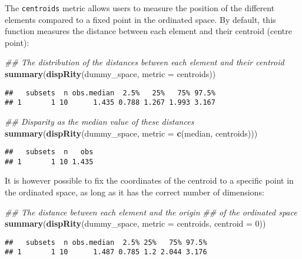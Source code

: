 \documentclass[
]{book}
\newenvironment{Shaded}{\begin{snugshade}}{\end{snugshade}}
\newcommand{\CommentTok}[1]{\textcolor[rgb]{0.56,0.35,0.01}{\textit{#1}}}
\newcommand{\DataTypeTok}[1]{\textcolor[rgb]{0.13,0.29,0.53}{#1}}
\newcommand{\DecValTok}[1]{\textcolor[rgb]{0.00,0.00,0.81}{#1}}
\newcommand{\KeywordTok}[1]{\textcolor[rgb]{0.13,0.29,0.53}{\textbf{#1}}}
\newcommand{\NormalTok}[1]{#1}
\begin{document}
The \texttt{centroids} metric allows users to measure the position of the different elements compared to a fixed point in the ordinated space.
By default, this function measures the distance between each element and their centroid (centre point):

\begin{Shaded}
\begin{Highlighting}[]
\CommentTok{\#\# The distribution of the distances between each element and their centroid}
\KeywordTok{summary}\NormalTok{(}\KeywordTok{dispRity}\NormalTok{(dummy\_space, }\DataTypeTok{metric =}\NormalTok{ centroids))}
\end{Highlighting}
\end{Shaded}

\begin{verbatim}
##   subsets  n obs.median  2.5%   25%   75% 97.5%
## 1       1 10      1.435 0.788 1.267 1.993 3.167
\end{verbatim}

\begin{Shaded}
\begin{Highlighting}[]
\CommentTok{\#\# Disparity as the median value of these distances}
\KeywordTok{summary}\NormalTok{(}\KeywordTok{dispRity}\NormalTok{(dummy\_space, }\DataTypeTok{metric =} \KeywordTok{c}\NormalTok{(median, centroids)))}
\end{Highlighting}
\end{Shaded}

\begin{verbatim}
##   subsets  n   obs
## 1       1 10 1.435
\end{verbatim}

It is however possible to fix the coordinates of the centroid to a specific point in the ordinated space, as long as it has the correct number of dimensions:

\begin{Shaded}
\begin{Highlighting}[]
\CommentTok{\#\# The distance between each element and the origin}
\CommentTok{\#\# of the ordinated space}
\KeywordTok{summary}\NormalTok{(}\KeywordTok{dispRity}\NormalTok{(dummy\_space, }\DataTypeTok{metric =}\NormalTok{ centroids, }\DataTypeTok{centroid =} \DecValTok{0}\NormalTok{))}
\end{Highlighting}
\end{Shaded}

\begin{verbatim}
##   subsets  n obs.median  2.5% 25%   75% 97.5%
## 1       1 10      1.487 0.785 1.2 2.044 3.176
\end{verbatim}
\end{document}
